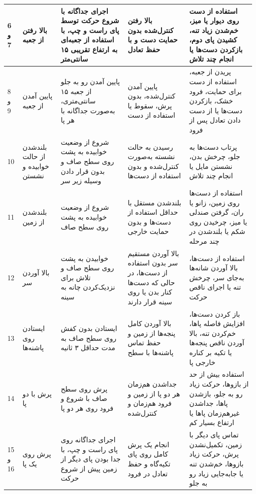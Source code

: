 \begin{center}
\begin{longtable}{|p{}|p{}|p{}|p{}|p{}|}
		6 و 7 &
		بالا رفتن از جعبه &
		اجرای جداگانه با شروع حرکت توسط پای راست و چپ، با استفاده از جعبه‌ای به ارتفاع تقریبی ۱۵ سانتی‌متر &
		بالا رفتن کنترل‌شده بدون حمایت دست و با حفظ تعادل &
		استفاده از دست روی دیوار یا میز، خم‌شدن زیاد تنه، کشیدن پای دوم، بازکردن دست‌ها یا انجام چند تلاش
		\\
		\hline
		
		8 و 9 &
		پایین آمدن از جعبه &
		پایین آمدن رو به جلو از جعبه ۱۵ سانتی‌متری، به‌صورت جداگانه با هر پا &
		پایین آمدن کنترل‌شده، بدون پرش، سقوط یا استفاده از دست &
		پریدن از جعبه، استفاده از دست برای حمایت، فرود خشک، بازکردن دست‌ها یا از دست دادن تعادل پس از فرود
		\\
		\hline
		
		10 &
		بلندشدن از حالت خوابیده و نشستن &
		شروع از وضعیت خوابیده به پشت روی سطح صاف و بدون قرار دادن وسیله زیر سر &
		رسیدن به حالت نشسته به‌صورت کنترل‌شده و بدون استفاده از دست‌ها &
		پرتاب دست‌ها به جلو، چرخش بدن، نشستن مایل یا انجام چند تلاش
		\\
		\hline
		
		11 &
		بلندشدن از زمین &
		شروع از وضعیت خوابیده به پشت روی سطح صاف &
		بلندشدن مستقل با حداقل استفاده از دست‌ها و بدون حمایت خارجی &
		استفاده از دست‌ها روی زمین، زانو یا ران، گرفتن صندلی یا میز، چرخیدن روی شکم یا بلندشدن در چند مرحله
		\\
		\hline
		
		12 &
		بالا آوردن سر &
		خوابیدن به پشت روی سطح صاف و تلاش برای نزدیک‌کردن چانه به سینه &
		بالا آوردن مستقیم سر بدون استفاده از دست‌ها، در حالی که دست‌ها کنار بدن یا روی سینه قرار دارند &
		استفاده از دست‌ها، بالا آوردن شانه‌ها به‌جای سر، چرخش تنه یا اجرای ناقص حرکت
		\\
		\hline
		
		13 &
		ایستادن روی پاشنه‌ها &
		ایستادن بدون کفش روی سطح صاف به مدت حداقل ۳ ثانیه &
		بالا آوردن کامل پنجه‌ها از زمین و حفظ تماس پاشنه‌ها با سطح &
		باز کردن دست‌ها، افزایش فاصله پاها، خم‌کردن تنه، بالا آوردن ناقص پنجه‌ها یا تکیه بر کناره خارجی پا
		\\
		\hline
		
		14 &
		پرش با دو پا &
		پرش روی سطح صاف با شروع و فرود روی هر دو پا &
		جداشدن هم‌زمان هر دو پا از زمین و فرود هم‌زمان و کنترل‌شده &
		استفاده بیش از حد از بازوها، حرکت زیاد رو به جلو، بازشدن پاها، جداشدن غیرهم‌زمان پاها یا ارتفاع بسیار کم
		\\
		\hline
		
		15 و 16 &
		پرش روی یک پا &
		اجرای جداگانه روی پای راست و چپ، با جدا بودن پای دیگر از زمین پیش از شروع حرکت &
		انجام یک پرش کامل روی پای تکیه‌گاه و حفظ تعادل در فرود &
		تماس پای دیگر با زمین، تکمیل‌نشدن پرش، حرکت زیاد بازوها، خم‌شدن تنه یا جابه‌جایی زیاد رو به جلو
		\\
		\hline
		

\end{longtable}
\end{center}
